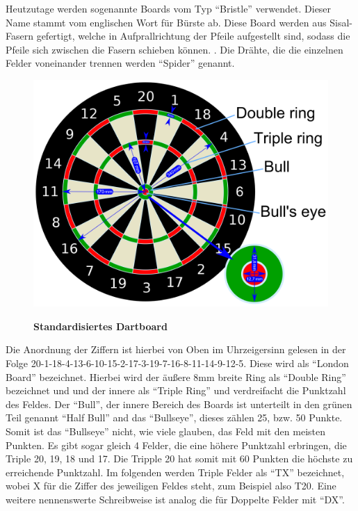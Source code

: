 Heutzutage werden sogenannte Boards vom Typ "`Bristle"' verwendet. Dieser Name stammt vom englischen Wort für Bürste ab. Diese Board werden aus Sisal-Fasern gefertigt, welche in Aufprallrichtung der Pfeile aufgestellt sind, sodass die Pfeile sich zwischen die Fasern schieben können. \autocite[6]{dph2015}. Die Drähte, die die einzelnen Felder voneinander trennen werden "`Spider"' genannt.
\begin{figure}
\includegraphics[width=\textwidth]{media/Dartboard_Abmessungen}\\
\caption{\textbf{Standardisiertes Dartboard\cite{Board2016}}
}
\label{Fig:dartboard}
\end{figure}

Die Anordnung der Ziffern ist hierbei von Oben im Uhrzeigersinn gelesen in der Folge 20-1-18-4-13-6-10-15-2-17-3-19-7-16-8-11-14-9-12-5. Diese wird als "`London Board"' bezeichnet. Hierbei wird der äußere 8mm breite Ring als "`Double Ring"' bezeichnet und und der innere als "`Triple Ring"' und verdreifacht die Punktzahl des Feldes. Der "`Bull"', der innere Bereich des Boards ist unterteilt in den grünen Teil genannt "`Half Bull"' and das "`Bullseye"', dieses zählen 25, bzw. 50 Punkte. 
Somit ist das "`Bullseye"' nicht, wie viele glauben, das Feld mit den meisten Punkten. Es gibt sogar gleich 4 Felder, die eine höhere Punktzahl erbringen, die Triple 20, 19, 18 und 17. Die Tripple 20 hat somit mit 60 Punkten die höchste zu erreichende Punktzahl. Im folgenden werden Triple Felder als "`TX"' bezeichnet, wobei X für die Ziffer des jeweiligen Feldes steht, zum Beispiel also T20. Eine weitere nennenswerte Schreibweise ist analog die für Doppelte Felder mit "`DX"'. 

